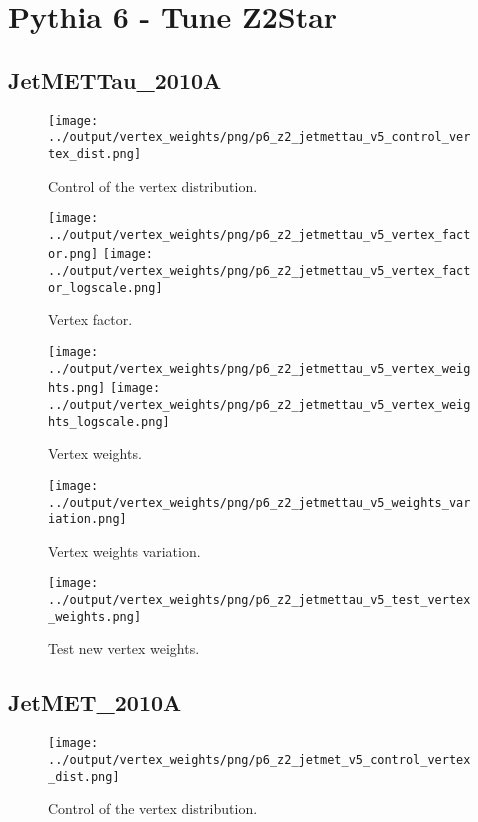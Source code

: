 \documentclass[11pt]{book}
\begin{document}
\section{Pythia 6 - Tune Z2Star}
\subsection{JetMETTau\_2010A}
\begin{figure}[ht]
\centering
\texttt{[image: ../output/vertex\_weights/png/p6\_z2\_jetmettau\_v5\_control\_vertex\_dist.png]}
\caption{Control of the vertex distribution.}
\end{figure}

\begin{figure}[ht]
\centering
\texttt{[image: ../output/vertex\_weights/png/p6\_z2\_jetmettau\_v5\_vertex\_factor.png]}
\texttt{[image: ../output/vertex\_weights/png/p6\_z2\_jetmettau\_v5\_vertex\_factor\_logscale.png]}
\caption{Vertex factor.}
\end{figure}

\begin{figure}[ht]
\centering
\texttt{[image: ../output/vertex\_weights/png/p6\_z2\_jetmettau\_v5\_vertex\_weights.png]}
\texttt{[image: ../output/vertex\_weights/png/p6\_z2\_jetmettau\_v5\_vertex\_weights\_logscale.png]}
\caption{Vertex weights.}
\end{figure}

\begin{figure}[ht]
\centering
\texttt{[image: ../output/vertex\_weights/png/p6\_z2\_jetmettau\_v5\_weights\_variation.png]}
\caption{Vertex weights variation.}
\end{figure}

\begin{figure}[ht]
\centering
\texttt{[image: ../output/vertex\_weights/png/p6\_z2\_jetmettau\_v5\_test\_vertex\_weights.png]}
\caption{Test new vertex weights.}
\end{figure}
\clearpage

\subsection{JetMET\_2010A}
\begin{figure}[ht]
\centering
\texttt{[image: ../output/vertex\_weights/png/p6\_z2\_jetmet\_v5\_control\_vertex\_dist.png]}
\caption{Control of the vertex distribution.}
\end{figure}
\end{document}
